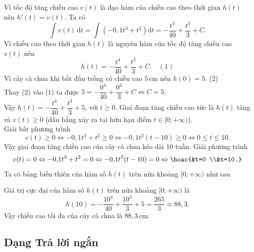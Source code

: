 \documentclass[12pt,aspectratio=169]{beamer}
\begin{document}
\begin{dungsai}[n]
	\begin{loigiai}
			\begin{itemchoice}
				\itemch Vì tốc độ tăng chiều cao $v(t)$ là đạo hàm của chiều cao theo thời gian $h(t)$ nên $h'(t)=v(t)$.
				\itemch Ta có
				\[\displaystyle\int v(t)\mathrm{\,d}t=\displaystyle\int \left(-0{,}1t^3+t^2\right)\mathrm{d}t=-\dfrac{t^4}{40}+\dfrac{t^3}{3}+C.
				\]
				Vì chiều cao theo thời gian $h(t)$ là nguyên hàm của tốc độ tăng chiều cao $v(t)$ nên
				\[h(t)=-\dfrac{t^4}{40}+\dfrac{t^3}{3}+C. \quad (1)
				\]
				Vì cây cà chua khi bắt đầu trồng có chiều cao $5$\,cm nên $h(0)=5$. \quad (2)\\
				Thay (2) vào (1) ta được
				$5=-\dfrac{0^4}{40}+\dfrac{0^3}{3}+C \Leftrightarrow C=5$.\\
				Vậy $h(t)=-\dfrac{t^4}{40}+\dfrac{t^3}{3}+5$, với $t\geq 0$.
				\itemch Giai đoạn tăng chiều cao tức là $h(t)$ tăng và $v(t)\geq 0$ (dấu bằng xảy ra tại hữu hạn điểm $t\in [0;+\infty)$). \\
				Giải bất phương trình
				\[v(t)\geq 0 \Leftrightarrow -0{,}1t^3+t^2\geq 0 \Leftrightarrow -0{,}1t^2(t-10)\geq 0 \Leftrightarrow 0\le t\le 10.
				\]
				Vậy giai đoạn tăng chiều cao của cây cà chua kéo dài $10$ tuần.
				\itemch
				Giải phương trình
				\[v(t)=0 \Leftrightarrow -0{,}1t^3+t^2=0 \Leftrightarrow -0{,}1t^2(t-10)=0 \Leftrightarrow \hoac{&t=0 \\&t=10.}
				\]
				Ta có bảng biến thiên của hàm số $h(t)$ trên nửa khoảng $[0;+\infty)$ như sau
				\begin{center}
			\end{center}
			Giá trị cực đại của hàm số $h(t)$ trên nửa khoảng $[0;+\infty)$ là
			\[h(10)=-\dfrac{10^4}{40}+\dfrac{10^3}{3}+5=\dfrac{265}{3}\approx 88{,}3.
			\]
			Vậy chiều cao tối đa của cây cà chua là $88{,}3$\,cm.
		\end{itemchoice}
	\end{loigiai}
\end{dungsai}

\subsection{Dạng Trả lời ngắn}
\end{document}
